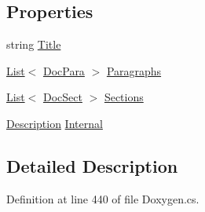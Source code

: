 \subsection*{Properties}
\begin{DoxyCompactItemize}
\item 
string \hyperlink{class_software_engineering_tools_1_1_documentation_1_1_description_a037f99f3a2542aac9a84a820934c3134}{Title}
\item 
\hyperlink{namespace_software_engineering_tools_1_1_documentation_ae0bccf4f49a76db084c1c316e5954ec9a4ee29ca12c7d126654bd0e5275de6135}{List}$<$ \hyperlink{class_software_engineering_tools_1_1_documentation_1_1_doc_para}{Doc\+Para} $>$ \hyperlink{class_software_engineering_tools_1_1_documentation_1_1_description_aac9bd87b495aeecf95fe6b696f929cae}{Paragraphs}
\item 
\hyperlink{namespace_software_engineering_tools_1_1_documentation_ae0bccf4f49a76db084c1c316e5954ec9a4ee29ca12c7d126654bd0e5275de6135}{List}$<$ \hyperlink{class_software_engineering_tools_1_1_documentation_1_1_doc_sect}{Doc\+Sect} $>$ \hyperlink{class_software_engineering_tools_1_1_documentation_1_1_description_a77b76a6eb0dde987ea3b919ccd094a25}{Sections}
\item 
\hyperlink{class_software_engineering_tools_1_1_documentation_1_1_description}{Description} \hyperlink{class_software_engineering_tools_1_1_documentation_1_1_description_a26bb938e6775c1c7bfeff9ffd6f913f7}{Internal}
\end{DoxyCompactItemize}


\subsection{Detailed Description}


Definition at line 440 of file Doxygen.\+cs.




